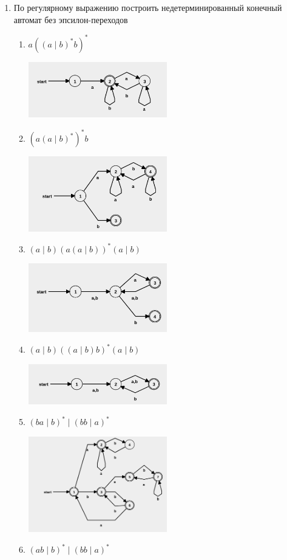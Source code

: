 \documentclass[12pt]{article}
\begin{document}
\begin{enumerate}
  \item По регулярному выражению построить недетерминированный конечный автомат без эпсилон-переходов
  \begin{enumerate}[label=\arabic*)]
    \setlength\itemsep{0.8em}

    \item $a ((a \mid b)^* b)^* $

    \includegraphics[width=0.5\textwidth]{5.1.png}
    \item $(a (a \mid b)^*)^* b $

    \includegraphics[width=0.5\textwidth]{5.2.png}
    \item $(a \mid b) (a (a \mid b))^* (a \mid b) $

    \includegraphics[width=0.5\textwidth]{5.3.png}
    \item $(a \mid b) ((a \mid b) b)^* (a \mid b) $

    \includegraphics[width=0.5\textwidth]{5.4.png}
    \item $(ba \mid b)^* \mid (bb \mid a)^*$

    \includegraphics[width=0.5\textwidth]{5.5.png}
    \item $(ab \mid b)^* \mid (bb \mid a)^*$


\end{enumerate}
\end{enumerate}
\end{document}
